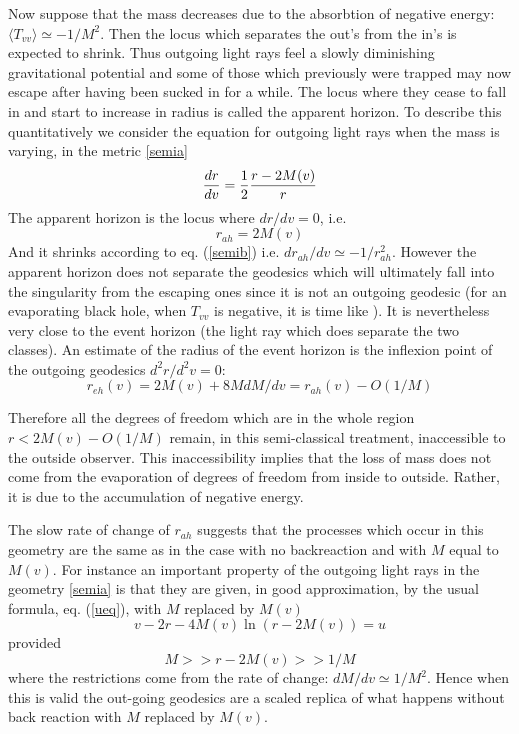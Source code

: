 \documentclass[12pt,oneside]{report}
\begin{document}
Now suppose that the mass decreases due to the absorbtion of
negative energy: $\langle T_{vv} \rangle \simeq -1/M^2$.
 Then the locus which separates the out's
from the in's is expected to shrink. Thus outgoing light
rays feel a slowly diminishing  gravitational potential
and some of those which previously were trapped may now
escape after having been sucked in for a while. The locus
where they cease to fall in and start to increase in
radius is called the apparent horizon. To describe this
quantitatively we consider the equation for outgoing light
rays when the mass is varying, in the metric \ref{semia}
\begin{equation}
{dr \over dv} = {1 \over 2} {r-2 M(v) \over r}
\label{semic}
\end{equation}
The apparent horizon is the locus where $dr/dv =0$, i.e.
\begin{equation}
r_{ah}=2M(v)
\label{rah}
\end{equation}
And it shrinks according to eq. (\ref{semib}) 
 i.e. $dr_{ah}/dv \simeq -1
/ r_{ah}^2$. However the apparent horizon does not separate
the geodesics which will ultimately fall into  the
singularity from the escaping ones since it is not an outgoing geodesic (for an evaporating
black hole, when $T_{vv}$ is negative, it is time like
 \cite{EH}). It 
is nevertheless very close to the event horizon (the light
ray which does separate the two classes). An estimate of the 
radius of the event horizon is
the inflexion point of the outgoing geodesics $d^2r/d^2v =0$: 
\begin{equation}
r_{eh}(v) = 2 M(v) + 8 M
dM/dv =  r_{ah}(v)  - O(1 / M)
\label{reh}
\end{equation}

 Therefore all the degrees of freedom which are in
the whole region $r<2M(v) -O(1/M)$ remain, in this semi-classical
treatment, inaccessible to the
outside observer.
This inaccessibility implies that the loss of mass does
not come from the evaporation of degrees of freedom from
inside to outside. Rather, it is due to the accumulation
of negative energy. 

The slow rate of change of $r_{ah}$ suggests that the processes which 
occur in this geometry are the same as in the case with no backreaction and
with $M$ equal to $M(v)$. For instance an important
property of the outgoing light rays in the
geometry \ref{semia} is that they are given, in good approximation,
 by the usual
formula, eq. (\ref{ueq}), with $M$ replaced by $M(v)$
\begin{equation}
v-2r -4M(v) \ln (r-2M(v)) =u
\label{semid}
\end{equation}
provided
\begin{equation}
M>>r-2M(v) >> 1/M
\end{equation}
where the restrictions come from the rate of change: $dM/dv  \simeq 1/M^2$.
Hence when this is valid the out-going geodesics are a scaled
replica of what happens without back reaction with $M$
replaced by $M(v)$. 
\end{document}
